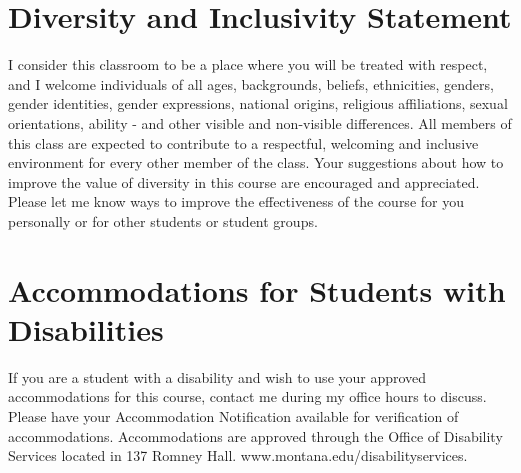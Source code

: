 \documentclass[letterpaper]{inzane_syllabus} %
\begin{document}
\vspace{0.4cm}
%
%
%


\vspace{0.4cm}
\section{Diversity and Inclusivity Statement}

I consider this classroom to be a place where you will be treated with respect, and I welcome individuals of all ages, backgrounds, beliefs, ethnicities, genders, gender identities, gender expressions, national origins, religious affiliations, sexual orientations, ability - and other visible and non-visible differences. All members of this class are expected to contribute to a respectful, welcoming and inclusive environment for every other member of the class.  Your suggestions about how to improve the value of diversity in this course are encouraged and appreciated. Please let me know ways to improve the effectiveness of the course for you personally or for other students or student groups.
 
\vspace{0.4cm}
\section{Accommodations for Students with Disabilities}

If you are a student with a disability and wish to use your approved accommodations for this course, contact me during my office hours to discuss. Please have your Accommodation Notification available for verification of accommodations. Accommodations are approved through the Office of Disability Services located in 137 Romney Hall.  www.montana.edu/disabilityservices.
\end{document}
